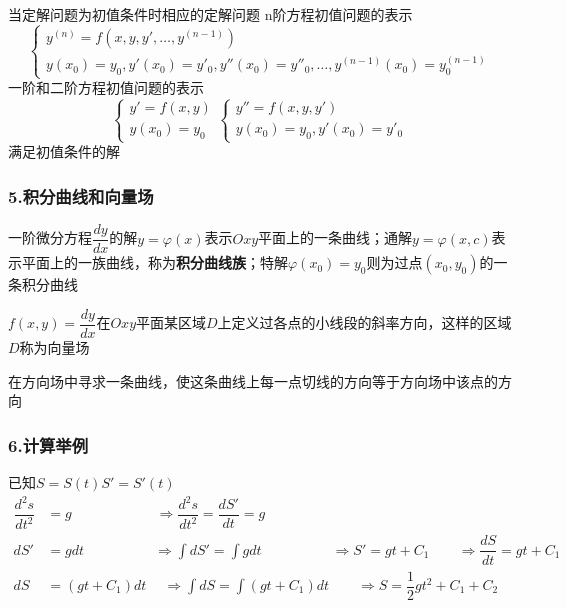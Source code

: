 \documentclass[oneside]{book} %
\begin{document}
\noindent {}当定解问题为初值条件时相应的定解问题
n阶方程初值问题的表示
\[
\begin{cases}
    y^{(n)} = f(x,y,y',\dots,y^{(n-1)}) \\
    y(x_{0}) = y_{0} , y'(x_{0}) = y'_{0} , y''(x_{0}) = y''_{0} , \dots , y^{(n-1)}(x_{0}) = y^{(n-1)}_{0}
\end{cases}\]
一阶和二阶方程初值问题的表示
\[
\begin{cases}
    y' = f(x,y) \\
    y(x_{0}) = y_{0}
\end{cases}
\begin{cases}
    y'' = f(x,y,y') \\
    y(x_{0}) = y_{0} , y'(x_{0}) = y'_{0}
\end{cases}
\]
满足初值条件的解

\subsubsection{5.积分曲线和向量场}
\noindent {}一阶微分方程$\dfrac{dy}{dx}$的解$y = \varphi(x)$表示$Oxy$平面上的一条曲线；通解$y = \varphi(x,c)$表示平面上的一族曲线，称为\textbf{积分曲线族}；特解$\varphi(x_{0}) = y_{0}$则为过点$(x_{0},y_{0})$的一条积分曲线

\noindent {}$f(x , y) = \dfrac{dy}{dx}$在$Oxy$平面某区域$D$上定义过各点的小线段的斜率方向，这样的区域$D$称为向量场

\noindent {}在方向场中寻求一条曲线，使这条曲线上每一点切线的方向等于方向场中该点的方向

\subsubsection{6.计算举例}
已知$S = S(t)$$S' = S'(t)$
\begin{align*}
    \dfrac{d^{2}s}{d t^{2}} & = g \quad \quad \quad \quad \quad \quad \Rightarrow 
    \dfrac{d^{2}s}{d t^{2}} = \dfrac{dS'}{dt} = g \\
    dS' & = g dt \quad \quad \quad \quad \quad \Rightarrow 
    \int dS' = \int g dt \quad \quad \quad \quad \quad \Rightarrow 
    S' = gt + C_{1} \quad \quad \Rightarrow
    \dfrac{dS}{dt} = gt + C_{1} \\
    dS & = (gt + C_{1}) dt \quad \ \Rightarrow 
    \int dS = \int (gt + C_{1}) dt \quad \quad \Rightarrow 
    S = \dfrac{1}{2} gt^{2} + C_{1} + C_{2}
\end{align*}
\end{document}
